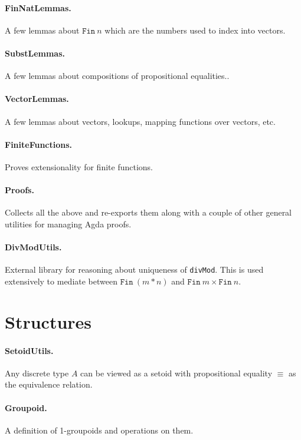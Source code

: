 \documentclass{article}
\begin{document}
\paragraph*{FinNatLemmas.} A few lemmas about $\texttt{Fin}~n$ which
are the numbers used to index into vectors.

\paragraph*{SubstLemmas.} A few lemmas about compositions of
propositional equalities..

\paragraph*{VectorLemmas.} A few lemmas about vectors, lookups,
mapping functions over vectors, etc.

\paragraph*{FiniteFunctions.} Proves extensionality for finite functions. 

\paragraph*{Proofs.} Collects all the above and re-exports them along
with a couple of other general utilities for managing Agda proofs.

\paragraph*{DivModUtils.} External library for reasoning about
uniqueness of \texttt{divMod}. This is used extensively to mediate
between $\texttt{Fin}~(m*n)$ and
$\texttt{Fin}~m \times \texttt{Fin}~n$.

\section{Structures}

\paragraph*{SetoidUtils.} Any discrete type $A$ can be viewed as a
setoid with propositional equality $\equiv$ as the equivalence
relation.

\paragraph*{Groupoid.} A definition of 1-groupoids and operations on 
them. 
\end{document}
